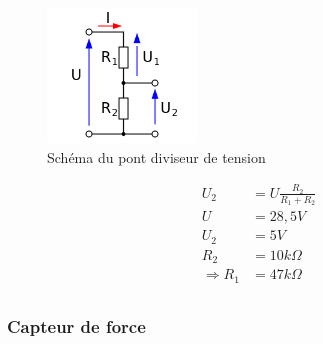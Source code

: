 \documentclass[11pt]{article}
\begin{document}
\begin{figure}[!h]
    \centering
    \includegraphics[width=150px]{Pont_diviseur.png}
    \caption{Schéma du pont diviseur de tension}
\end{figure}

\begin{equation}
 	\begin{split}
		U_{2} &= U \frac{R_{2}}{R_{1}+R_{2}}\\
		U &= 28,5 V\\
		U_{2} &= 5V\\
		R_{2} &= 10k\Omega\\
		\Rightarrow R_{1} &= 47k\Omega\\
	\end{split}
\end{equation}


\subsubsection{Capteur de force}
\end{document}
